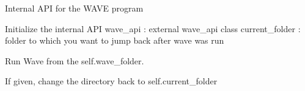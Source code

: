 \documentclass[letterpaper,10pt,english]{sphinxmanual}
\begin{document}

\begin{fulllineitems}
\label{\detokenize{autoapi/unduwave/index:unduwave.wave_control}}
\pysigstartsignatures
{}
\pysigstopsignatures
\sphinxAtStartPar
Internal API for the WAVE program

\sphinxAtStartPar
Initialize the internal API
wave\_api : external wave\_api class
current\_folder : folder to which you want to jump back after wave was run

\begin{fulllineitems}
\label{\detokenize{autoapi/unduwave/index:unduwave.wave_control.run}}
\pysigstartsignatures
{}
\pysigstopsignatures
\sphinxAtStartPar
Run Wave from the self.wave\_folder.

\sphinxAtStartPar
If given, change the directory back to self.current\_folder

\end{fulllineitems}


\end{fulllineitems}

\end{document}
